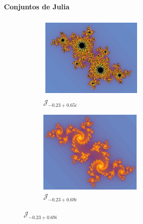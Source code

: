 \begin{frame}{\insertsectionhead}
\framesubtitle{Conjuntos de Julia}
    \begin{figure}[ht!]
\hspace{\fill}
    \begin{subfigure}[b]{0.3\textwidth}
      \includegraphics[height=4cm]{screenshots/Julia.png}
      \caption*{{\normalsize $\mathcal{J}_{-0.23+0.65i}$}}
    \end{subfigure}
    \hspace{\fill}
    \begin{subfigure}[b]{0.3\textwidth}
      \includegraphics[height=4cm]{screenshots/juliaSetPlot-1.png}
      \caption*{{\normalsize $\mathcal{J}_{-0.23+0.69i}$}}
    \end{subfigure}
    \hspace{\fill}
  \end{figure}

\end{frame}

    


